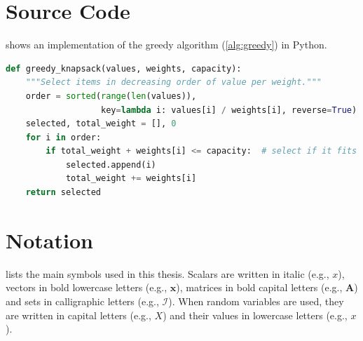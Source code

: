 \chapter{Source Code}
\label{chap:source-code}

 shows an implementation of the greedy algorithm (\cref{alg:greedy}) in Python.

\begin{lstlisting}[language=Python, caption={Implementation of the greedy algorithm}, label=lst:greedy]
def greedy_knapsack(values, weights, capacity):
    """Select items in decreasing order of value per weight."""
    order = sorted(range(len(values)),
                   key=lambda i: values[i] / weights[i], reverse=True)
    selected, total_weight = [], 0
    for i in order:
        if total_weight + weights[i] <= capacity:  # select if it fits
            selected.append(i)
            total_weight += weights[i]
    return selected
\end{lstlisting}

\chapter{Notation}
\label{chap:notation}

 lists the main symbols used in this thesis.
Scalars are written in italic (e.g., $x$), vectors in bold lowercase letters (e.g., $\mathbf{x}$),
matrices in bold capital letters (e.g., $\mathbf{A}$) and sets in calligraphic letters (e.g., $\mathcal{I}$).
When random variables are used, they are written in capital letters (e.g., $X$)
and their values in lowercase letters (e.g., $x$).

